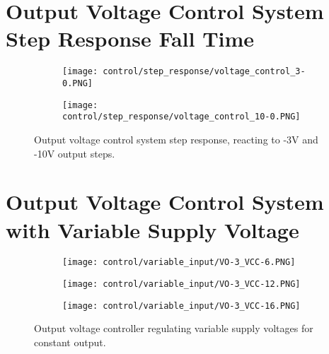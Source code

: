 \section*{Output Voltage Control System Step Response Fall Time} \label{A:control_step_fall}
\begin{figure}[H]
    \centering
    \begin{subfigure}{0.7\textwidth}
        \texttt{[image: control/step\_response/voltage\_control\_3-0.PNG]}
    \end{subfigure}
    \begin{subfigure}{0.7\textwidth}
        \texttt{[image: control/step\_response/voltage\_control\_10-0.PNG]}
    \end{subfigure}
    \caption{Output voltage control system step response, reacting to -3V and -10V output steps.}
\end{figure}

\section*{Output Voltage Control System with Variable Supply Voltage} \label{A:control_supply_change}
\begin{figure}[H]
    \centering
    \begin{subfigure}{0.62\textwidth}
        \texttt{[image: control/variable\_input/VO-3\_VCC-6.PNG]}
    \end{subfigure}
    \begin{subfigure}{0.62\textwidth}
        \texttt{[image: control/variable\_input/VO-3\_VCC-12.PNG]}
    \end{subfigure}
    \begin{subfigure}{0.62\textwidth}
        \texttt{[image: control/variable\_input/VO-3\_VCC-16.PNG]}
    \end{subfigure}
    \caption{Output voltage controller regulating variable supply voltages for constant output.}
\end{figure}


